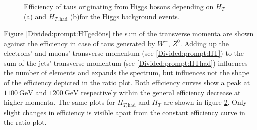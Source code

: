 \begin{figure}
\begin{subfigure}[t]{0.49\textwidth}
                \label{Divided:fromH:HThad}
                \end{subfigure}
\caption[Efficiency of taus originating from Higgs bosons for the Higgs background events.]{Efficiency of taus originating from Higgs bosons depending on $H_{T}$ (a) and $H_{T,\text{had}}$ (b)for the Higgs background events.}
\label{Divided:fromH:HTgedöns}
\end{figure}
%
Figure \ref{Divided:prompt:HTgedöns} the sum of the transverse momenta are shown against the efficiency in case of taus generated by $W^\pm$, $Z^0$. Adding up the electrons' and muons' transverse momentum (see \ref{Divided:prompt:HT}) to the sum of the jets' transverse momentum (see \ref{Divided:prompt:HThad}) influences the number of elements and expands the spectrum, but influences not the shape of the efficiency depicted in the ratio plot. Both efficiency curves show a peak at $\SI{1100}{\giga\electronvolt}$ and $\SI{1200}{\giga\electronvolt}$ respectively within the general efficiency decrease at higher momenta.
The same plots for $H_{T,\text{had}}$ and $H_{T}$ are shown in figure \ref{Divided:fromH:HTgedöns}. Only slight changes in efficiency is visible apart from the constant efficiency curve in the ratio plot.\newline
%
